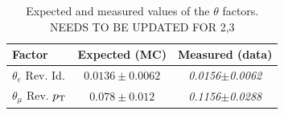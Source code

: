 \begin{table}
  \begin{center} 
{\small \begin{tabular}{ l c c }
\hline Factor    &  Expected (MC) & Measured (data) \\ \hline
 $\theta_{e}$ Rev. Id.  & $0.0136\pm 0.0062$  & \textit{ 0.0156$\pm$0.0062}  \\ 
 $\theta_{\mu}$ Rev. $p_{\rm T}$ & $0.078\pm0.012$ & \textit{ 0.1156$\pm$0.0288} \\ \hline %

\end{tabular}}
\caption{ Expected and measured values of the $\theta$ factors. NEEDS TO BE UPDATED FOR 2,3\label{table:background_theta}} 
\end{center}
\end{table} 


